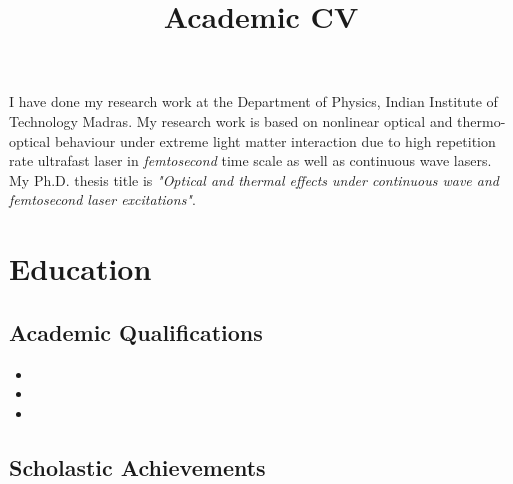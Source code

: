 \documentclass[11pt,a4paper,sans]{moderncv}        %
\title{Academic CV}                               %
\begin{document}
\makecvtitle

\small{
	I have done my research work at the Department of Physics, Indian Institute of Technology Madras. My research work is based on nonlinear optical and thermo-optical behaviour under extreme light matter interaction due to high repetition rate ultrafast laser in \textit{femtosecond} time scale as well as continuous wave lasers. My Ph.D. thesis title is \emph{"Optical and thermal effects under continuous wave and femtosecond laser excitations"}.
}
\section{Education}

\vspace{5pt}

\subsection{Academic Qualifications}

\vspace{5pt}

\begin{itemize}
	
	
	\item{}
	
	\item{}  %
	
	\item{}
	
\end{itemize}

\vspace{2pt}

\subsection{Scholastic Achievements}
\end{document}
